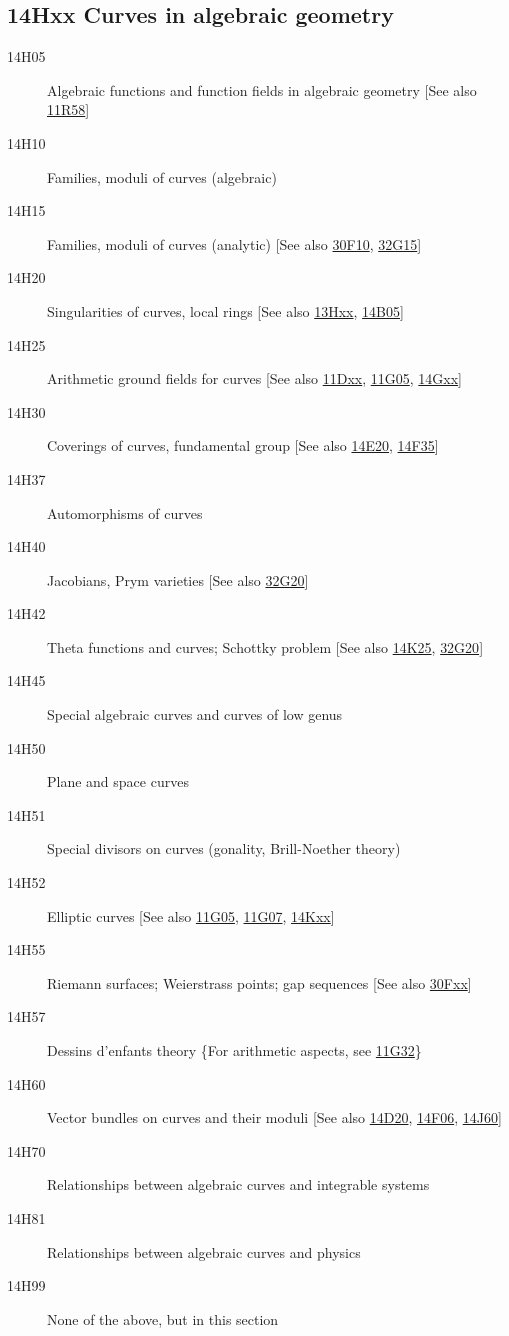 \subsection*{14Hxx Curves in algebraic geometry}\label{14Hxx}
\begin{description}               
\item [14H05]\label{14H05} Algebraic functions and function fields in algebraic geometry [See also \hyperref[11R58]{11R58}]
\item [14H10]\label{14H10} Families, moduli of curves (algebraic)
\item [14H15]\label{14H15} Families, moduli of curves (analytic) [See also \hyperref[30F10]{30F10}, \hyperref[32G15]{32G15}]
\item [14H20]\label{14H20} Singularities of curves, local rings [See also \hyperref[13Hxx]{13Hxx}, \hyperref[14B05]{14B05}]
\item [14H25]\label{14H25} Arithmetic ground fields for curves [See also \hyperref[11Dxx]{11Dxx}, \hyperref[11G05]{11G05}, \hyperref[14Gxx]{14Gxx}]
\item [14H30]\label{14H30} Coverings of curves, fundamental group [See also \hyperref[14E20]{14E20}, \hyperref[14F35]{14F35}]
\item [14H37]\label{14H37} Automorphisms of curves
\item [14H40]\label{14H40} Jacobians, Prym varieties [See also \hyperref[32G20]{32G20}]
\item [14H42]\label{14H42} Theta functions and curves; Schottky problem [See also \hyperref[14K25]{14K25}, \hyperref[32G20]{32G20}]
\item [14H45]\label{14H45} Special algebraic curves and curves of low genus
\item [14H50]\label{14H50} Plane and space curves
\item [14H51]\label{14H51} Special divisors on curves (gonality, Brill-Noether theory)
\item [14H52]\label{14H52} Elliptic curves [See also \hyperref[11G05]{11G05}, \hyperref[11G07]{11G07}, \hyperref[14Kxx]{14Kxx}]
\item [14H55]\label{14H55} Riemann surfaces; Weierstrass points; gap sequences [See also \hyperref[30Fxx]{30Fxx}]
\item [14H57]\label{14H57} Dessins d'enfants theory \{For arithmetic aspects, see \hyperref[11G32]{11G32}\}
\item [14H60]\label{14H60} Vector bundles on curves and their moduli [See also \hyperref[14D20]{14D20}, \hyperref[14F06]{14F06}, \hyperref[14J60]{14J60}]
\item [14H70]\label{14H70} Relationships between algebraic curves and integrable systems
\item [14H81]\label{14H81} Relationships between algebraic curves and physics
\item [14H99]\label{14H99} None of the above, but in this section
\end{description}          
